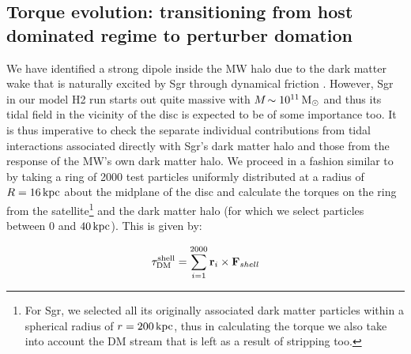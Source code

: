 \documentclass[useAMS,usenatbib]{mnras}
\begin{document}
\subsection{Torque evolution: transitioning from host dominated regime to perturber domation}

We have identified a strong dipole inside the MW halo due to the dark matter wake that is naturally excited by Sgr through dynamical friction \citep{weinberg89}. However, Sgr in our model H2 run starts out quite massive with $M\!\sim 10^{11}\, \rm{M_{\odot}}$ and thus its tidal field in the vicinity of the disc is expected to be of some importance too. It is thus imperative to check the separate individual contributions from tidal interactions associated directly with Sgr's dark matter halo and those from the response of the MW's own dark matter halo. We proceed in a fashion similar to \citep{gomez15b} by taking a ring of 2000 test particles uniformly distributed at a radius of $R=16\,\rm{kpc}$ about the midplane of the disc and calculate the torques on the ring from the satellite\footnote{For Sgr, we selected all its originally associated dark matter particles within a spherical radius of $r=200 \,\rm{kpc}$, thus in calculating the torque we also take into account the DM stream that is left as a result of stripping too.} and the dark matter halo (for which we select particles between $0$ and $40 \,\rm{kpc}$). This is given by:

\begin{equation}
\tau^{\rm{shel}l}_{\rm{DM}}=\sum\limits^{2000}_{i=1}\mathbf{r}_{i}\times \mathbf{F}_{shell}
\end{equation}
\end{document}
